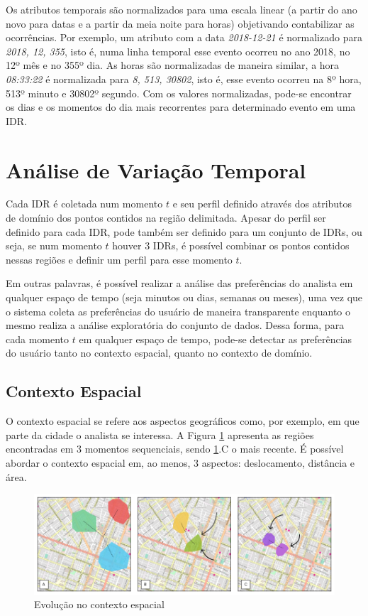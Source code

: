 Os atributos temporais são normalizados para uma escala linear (a partir do ano novo para datas e a partir da meia noite para horas) objetivando contabilizar as ocorrências. Por exemplo, um atributo com a data {\em 2018-12-21} é normalizado para {\em 2018, 12, 355}, isto é, numa linha temporal esse evento ocorreu no ano 2018, no 12º mês e no 355º dia. As horas são normalizadas de maneira similar, a hora {\em 08:33:22} é normalizada para {\em 8, 513, 30802}, isto é, esse evento ocorreu na 8º hora, 513º minuto e 30802º segundo. Com os valores normalizadas, pode-se encontrar os dias e os momentos do dia mais recorrentes para determinado evento em uma IDR.


\section{Análise de Variação Temporal}

Cada IDR é coletada num momento $t$ e seu perfil definido através dos atributos de domínio dos pontos contidos na região delimitada. Apesar do perfil ser definido para cada IDR, pode também ser definido para um conjunto de IDRs, ou seja, se num momento $t$ houver 3 IDRs, é possível combinar os pontos contidos nessas regiões e definir um perfil para esse momento $t$. 

Em outras palavras, é possível realizar a análise das preferências do analista em qualquer espaço de tempo (seja minutos ou dias, semanas ou meses), uma vez que o sistema coleta as preferências do usuário de maneira transparente enquanto o mesmo realiza a análise exploratória do conjunto de dados. Dessa forma, para cada momento $t$ em qualquer espaço de tempo, pode-se detectar as preferências do usuário tanto no contexto espacial, quanto no contexto de domínio.

\subsection{Contexto Espacial}

O contexto espacial se refere aos aspectos geográficos como, por exemplo, em que parte da cidade o analista se interessa. A Figura \ref{fig:analise-contexto-espacial} apresenta as regiões encontradas em 3 momentos sequenciais, sendo \ref{fig:analise-contexto-espacial}.C o mais recente. É possível abordar o contexto espacial em, ao menos, 3 aspectos: deslocamento, distância e área.

\begin{figure}[]
	\centering
	\includegraphics[width=\textwidth]{imagens/analise-contexto-espacial}
	\caption{Evolução no contexto espacial}
	\label{fig:analise-contexto-espacial}
\end{figure}

